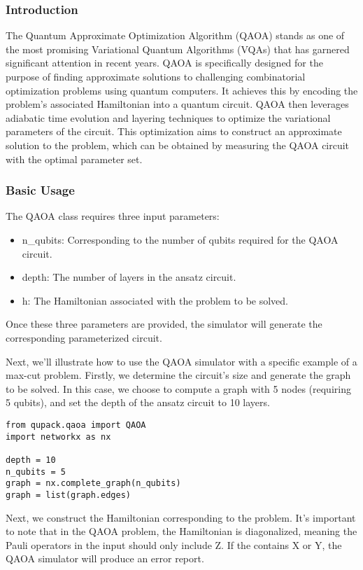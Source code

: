 
\subsubsection{Introduction}
The Quantum Approximate Optimization Algorithm (QAOA) stands as one of the most promising Variational Quantum Algorithms (VQAs) that has garnered significant attention in recent years. QAOA is specifically designed for the purpose of finding approximate solutions to challenging combinatorial optimization problems using quantum computers. It achieves this by encoding the problem's associated Hamiltonian into a quantum circuit. QAOA then leverages adiabatic time evolution and layering techniques to optimize the variational parameters of the circuit. This optimization aims to construct an approximate solution to the problem, which can be obtained by measuring the QAOA circuit with the optimal parameter set.

\subsubsection{Basic Usage}
The QAOA class requires three input parameters:
\begin{itemize}
    \item n\_qubits: Corresponding to the number of qubits required for the QAOA circuit.
    \item depth: The number of layers in the ansatz circuit.
    \item h: The Hamiltonian associated with the problem to be solved.
\end{itemize}

Once these three parameters are provided, the simulator will generate the corresponding parameterized circuit.

Next, we'll illustrate how to use the QAOA simulator with a specific example of a max-cut problem. Firstly, we determine the circuit's size and generate the graph to be solved. In this case, we choose to compute a graph with 5 nodes (requiring 5 qubits), and set the depth of the ansatz circuit to 10 layers.

\begin{lstlisting}
from qupack.qaoa import QAOA
import networkx as nx

depth = 10
n_qubits = 5
graph = nx.complete_graph(n_qubits)
graph = list(graph.edges)
\end{lstlisting}

Next, we construct the Hamiltonian corresponding to the problem. It's important to note that in the QAOA problem, the Hamiltonian is diagonalized, meaning the Pauli operators in the input  should only include Z. If the  contains X or Y, the QAOA simulator will produce an error report.

